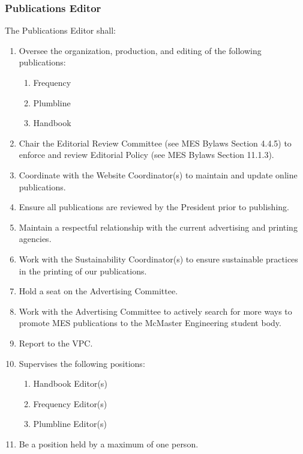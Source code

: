 
\subsubsection{Publications Editor}
\label{publications-editor}
The Publications Editor shall:

\begin{enumerate}
 \item
  Oversee the organization, production, and editing of the following publications:

  \begin{enumerate}
   \item
    Frequency
   \item
    Plumbline
   \item
    Handbook
  \end{enumerate}
 \item
  Chair the Editorial Review Committee (see MES Bylaws Section 4.4.5) to enforce and review Editorial Policy (see MES Bylaws Section 11.1.3).
 \item
  Coordinate with the Website Coordinator(s) to maintain and update online publications.
 \item
  Ensure all publications are reviewed by the President prior to publishing.
 \item
  Maintain a respectful relationship with the current advertising and printing agencies. 
 \item   
  Work with the Sustainability Coordinator(s) to ensure sustainable practices in the printing of our publications.
 \item
  Hold a seat on the Advertising Committee.
 \item
  Work with the Advertising Committee to actively search for more ways to promote MES publications to the McMaster Engineering student body.
 \item
  Report to the VPC.
 \item
  Supervises the following positions:

  \begin{enumerate}
   \item
    Handbook Editor(s)
   \item
    Frequency Editor(s)
   \item
    Plumbline Editor(s)
  \end{enumerate}
 \item
  Be a position held by a maximum of one person.

\end{enumerate}